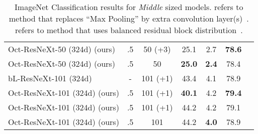 \documentclass[10pt,twocolumn,letterpaper]{article}
\newcommand{\hiConvPrefix}[0]{Oct\xspace}
\begin{document}
\begin{table}[t]
{\begin{tabular}{lcccccc}
   \hiConvPrefix-ResNeXt-50 (324d) (ours)
                    &  .5   &  50 (+3) &        25.1   &         2.7   & \textbf{78.6}     \\
   \hiConvPrefix-ResNeXt-50 (324d) (ours)
                    &  .5   &    50    &\textbf{25.0 } & \textbf{2.4 } &      78.4         \\
   \midrule
   bL-ResNeXt-101  (324d)~\cite{bLNet} 
                                 &   -   & 101 (+1) &43.4  &         4.1   &      78.9         \\
   \hiConvPrefix-ResNeXt-101  (324d) (ours)
                    &  .5   & 101 (+1) &        \textbf{40.1}   &         4.2  & \textbf{79.4}     \\
   \hiConvPrefix-ResNeXt-101 (324d) (ours)
                    &  .5   & 101 (+1) &        44.2   &         4.2   &      79.1         \\
   \hiConvPrefix-ResNeXt-101 (324d) (ours)
                    &  .5   &   101    &        44.2   & \textbf{4.0} &      78.9         \\
  \bottomrule
  \end{tabular}
}
\vspace{-8pt}
\caption{ImageNet Classification results for \textit{Middle} sized models. 
 refers to method that replaces ``Max Pooling'' by extra convolution layer(s)~\cite{bLNet}.  refers to method that uses balanced residual block distribution~\cite{bLNet}.
}
\label{tab:cls:sota:medium}
\end{table} 
\end{document}
